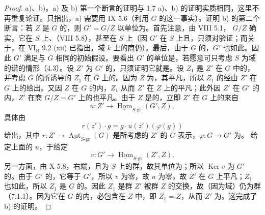 \begin{proof}
a)、b)。a) 及 b) 第一个断言的证明与 1.7 a)、b) 的证明实质相同，这里不再重复论证。只指出，a) 需要用 IX 5.6（利用 $G$ 的这一事实）。证明 b) 的第二个断言：若 $Z$ 是 $G$ 的，则 $G'=G/Z$ 以单位为。首先注意，由 VIII 5.1， $G/Z$ 确实，它在 $S$ 上、（VIII 5.8），甚至在 $S$ 上（因 $G'$ 在 $S$ 上且，只须对验证；而关于，在 VI$_{\mathrm B}$ 9.2 (xii) 已指出，域 $k$ 上的商仍）。最后，由于 $G$ 的，$G'$ 也如此。因此 $G'$ 满足与 $G$ 相同的初始假设。要看出 $G'$ 的单位是，若愿意可只考虑 $S$ 为域的谱的情形（4.3）。设 $Z'$ 为 $G'$ 的，只须证明它就是。设 $Z_1$ 是 $Z'$ 在 $G$ 中的，并考虑 $G$ 的所诱导的 $Z_1$ 在 $G$ 上的。因为 $Z$ 为，其平凡，所以 $Z_1$ 的经由 $Z'$ 在 $G$ 上的给出。又因 $Z$ 在 $G$ 的内，$Z_1$ 从而 $Z'$ 在 $Z$ 上的平凡；此外因 $Z'$ 在 $G'$ 的内，$Z'$ 在商 $G/Z=G'$ 上的也平凡。由于 $Z$ 是的，立即 $Z'$ 在 $G$ 上的来自
\[u:Z'\longrightarrow\underline{\operatorname{Hom}}_{S\text{-gr}}(G',Z),\]
具体由
\[r(z')\cdot g=g\cdot u(z')(\varphi(g))\]
给出，其中 $r:Z'\to\underline{\operatorname{Aut}}_{S\text{-gr}}(G)$ 是所考虑的 $Z'$ 的 $G$-表示，$\varphi:G\to G'$ 为。
给定上面的 $u$，于给定
\[v:G'\longrightarrow\underline{\operatorname{Hom}}_{S\text{-gr}}(Z',Z).\]
另一方面，由 X 5.8，右端，且为 $S$ 上的群，故其单位为；所以 $\operatorname{Ker}v$ 为 $G'$ 的。由于 $G'$ 的，它等于 $G'$，所以 $v$ 为零，故 $u$ 为零，故 $Z'$ 在 $G$ 上平凡；$Z_1$ 也如此，所以 $Z_1$ 是 $G$ 的。因此 $Z_1$ 是群 $Z'$ 被群 $Z$ 的交换，故（因为域）仍为群（7.1.1）。因为它在 $G$ 的内，必包含在 $Z$ 中，即 $Z_1=Z$，从而 $Z'$ 为。这完成了 b) 的证明。


\end{proof}
